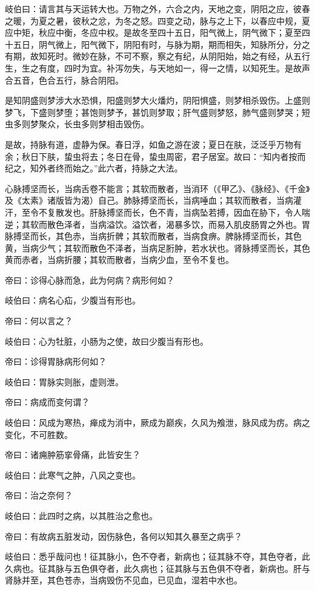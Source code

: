 \documentclass{article}%
\begin{document}
岐伯曰：请言其与天运转大也。万物之外，六合之内，天地之变，阴阳之应，彼春之暖，为夏之暑，彼秋之忿，为冬之怒。四变之动，脉与之上下，以春应中规，夏应中矩，秋应中衡，冬应中权。是故冬至四十五日，阳气微上，阴气微下；夏至四十五日，阴气微上，阳气微下，阴阳有时，与脉为期，期而相失，知脉所分，分之有期，故知死时。微妙在脉，不可不察，察之有纪，从阴阳始，始之有经，从五行生，生之有度，四时为宜。补泻勿失，与天地如一，得一之情，以知死生。是故声合五音，色合五行，脉合阴阳。

是知阴盛则梦涉大水恐惧，阳盛则梦大火燔灼，阴阳惧盛，则梦相杀毁伤。上盛则梦飞，下盛则梦堕；甚饱则梦予，甚饥则梦取；肝气盛则梦怒，肺气盛则梦哭；短虫多则梦聚众，长虫多则梦相击毁伤。

是故，持脉有道，虚静为保。春日浮，如鱼之游在波；夏日在肤，泛泛乎万物有余；秋日下肤，蛰虫将去；冬日在骨，蛰虫周密，君子居室。故曰：“知内者按而纪之，知外者终而始之。”此六者，持脉之大法。

心脉搏坚而长，当病舌卷不能言；其软而散者，当消环（《甲乙》、《脉经》、《千金》及《太素》诸版皆为渴）自己。肺脉搏坚而长，当病唾血；其软而散者，当病灌汗，至令不复散发也。肝脉搏坚而长，色不青，当病坠若搏，因血在胁下，令人喘逆；其软而散色泽者，当病溢饮。溢饮者，渴暴多饮，而易入肌皮肠胃之外也。胃脉搏坚而长，其色赤，当病折髀；其软而散者，当病食痹。脾脉搏坚而长，其色黄，当病少气；其软而散色不泽者，当病足胻肿，若水状也。肾脉搏坚而长，其色黄而赤者，当病折腰；其软而散者，当病少血，至令不复也。

帝曰：诊得心脉而急，此为何病？病形何如？

岐伯曰：病名心疝，少腹当有形也。

帝曰：何以言之？

岐伯曰：心为牡脏，小肠为之使，故曰少腹当有形也。

帝曰：诊得胃脉病形何如？

岐伯曰：胃脉实则胀，虚则泄。

帝曰：病成而变何谓？

岐伯曰：风成为寒热，瘅成为消中，厥成为巅疾，久风为飧泄，脉风成为疠。病之变化，不可胜数。

帝曰：诸痈肿筋挛骨痛，此皆安生？

岐伯曰：此寒气之肿，八风之变也。

帝曰：治之奈何？

岐伯曰：此四时之病，以其胜治之愈也。

帝曰：有故病五脏发动，因伤脉色，各何以知其久暴至之病乎？

岐伯曰：悉乎哉问也！征其脉小，色不夺者，新病也；征其脉不夺，其色夺者，此久病也。征其脉与五色俱夺者，此久病也；征其脉与五色俱不夺者，新病也。肝与肾脉并至，其色苍赤，当病毁伤不见血，已见血，湿若中水也。
\end{document}
